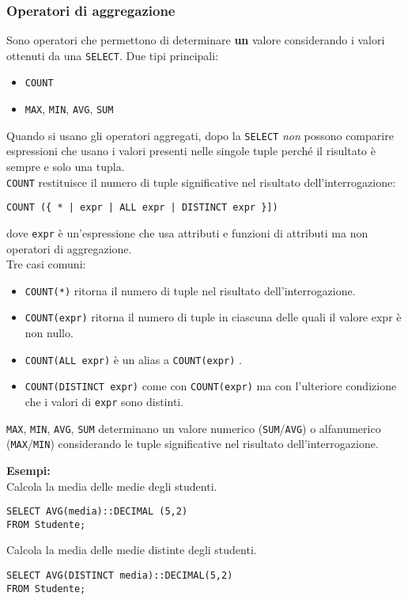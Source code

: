 \documentclass[a4paper, 10pt]{article}
\begin{document}
	\subsubsection{Operatori di aggregazione}
		Sono operatori che permettono di determinare \textbf{un} valore considerando i
		valori ottenuti da una \lstinline|SELECT|.
		Due tipi principali:
		\begin{itemize}
			\item \lstinline|COUNT|
			\item \lstinline|MAX|, \lstinline|MIN|, \lstinline|AVG|, \lstinline|SUM|
		\end{itemize}
		Quando si usano gli operatori aggregati, dopo la \lstinline|SELECT| \textit{non} possono
		comparire espressioni che usano i valori presenti nelle singole tuple
		perché il risultato è sempre e solo una tupla.
		\\
		\lstinline|COUNT| restituisce il numero di tuple significative nel risultato dell’interrogazione:
		\begin{lstlisting}
COUNT ({ * | expr | ALL expr | DISTINCT expr }])
		\end{lstlisting}
		dove \lstinline|expr| è un’espressione che usa attributi e funzioni di attributi ma non
		operatori di aggregazione.\\
		Tre casi comuni:
		\begin{itemize}
			\item \lstinline|COUNT(*)| ritorna il numero di tuple nel risultato dell’interrogazione.
			\item \lstinline|COUNT(expr)| ritorna il numero di tuple in ciascuna delle quali il valore
			expr è non nullo.
			\item \lstinline|COUNT(ALL expr)| è un alias a \lstinline|COUNT(expr)| .
			\item \lstinline|COUNT(DISTINCT expr)| come con \lstinline|COUNT(expr)| ma con l’ulteriore
			condizione che i valori di \lstinline|expr| sono distinti.
		\end{itemize}
		\lstinline|MAX|, \lstinline|MIN|, \lstinline|AVG|, \lstinline|SUM| determinano un valore numerico (\lstinline|SUM|/\lstinline|AVG|) o alfanumerico (\lstinline|MAX|/\lstinline|MIN|)
		considerando le tuple significative nel risultato dell’interrogazione.
		
		\noindent
		\textbf{Esempi: }\\
		Calcola la media delle medie degli studenti.
		\begin{lstlisting}
SELECT AVG(media)::DECIMAL (5,2)
FROM Studente;
		\end{lstlisting}
		Calcola la media delle medie distinte degli studenti.
		\begin{lstlisting}
SELECT AVG(DISTINCT media)::DECIMAL(5,2)
FROM Studente;
		\end{lstlisting}
		
\end{document}
